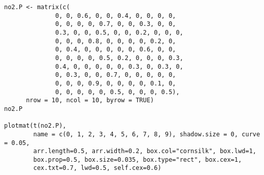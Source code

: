 \documentclass[answers]{exam}
\begin{document}
\begin{questions}
\begin{parts}
\begin{solution}
\begin{center}
                        \label{fig:markovchain_no2}
                    \end{center}

                \end{solution}
                \begin{minipage}[t]{.9\textwidth}
                    \begin{lstlisting}[title=Code]
no2.P <- matrix(c(
              0, 0, 0.6, 0, 0, 0.4, 0, 0, 0, 0,
              0, 0, 0, 0, 0.7, 0, 0, 0.3, 0, 0,
              0.3, 0, 0, 0.5, 0, 0, 0.2, 0, 0, 0,
              0, 0, 0, 0.8, 0, 0, 0, 0, 0.2, 0,
              0, 0.4, 0, 0, 0, 0, 0, 0.6, 0, 0,
              0, 0, 0, 0, 0.5, 0.2, 0, 0, 0, 0.3,
              0.4, 0, 0, 0, 0, 0, 0.3, 0, 0.3, 0,
              0, 0.3, 0, 0, 0.7, 0, 0, 0, 0, 0,
              0, 0, 0, 0.9, 0, 0, 0, 0, 0.1, 0,
              0, 0, 0, 0, 0, 0.5, 0, 0, 0, 0.5),
      nrow = 10, ncol = 10, byrow = TRUE)
no2.P

plotmat(t(no2.P),
        name = c(0, 1, 2, 3, 4, 5, 6, 7, 8, 9), shadow.size = 0, curve = 0.05,
        arr.length=0.5, arr.width=0.2, box.col="cornsilk", box.lwd=1, 
        box.prop=0.5, box.size=0.035, box.type="rect", box.cex=1, 
        cex.txt=0.7, lwd=0.5, self.cex=0.6)
                    \end{lstlisting}
                \end{minipage}
                \newline
                \begin{minipage}[t]{.9\textwidth}
                    \begin{lstlisting}[title=Output]

                    \end{lstlisting}
                \end{minipage}


\end{parts}
\end{questions}
\end{document}
